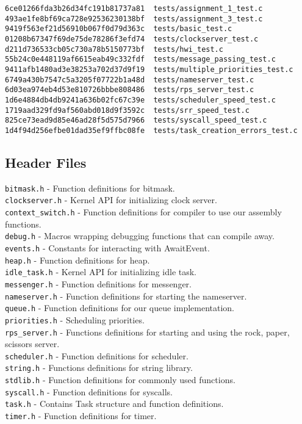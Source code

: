 \documentclass[letterpaper]{article}
\begin{document}
\begin{verbatim}
6ce01266fda3b26d34fc191b81737a81  tests/assignment_1_test.c
493ae1fe8bf69ca728e92536230138bf  tests/assignment_3_test.c
9419f563ef21d56910b067f0d79d363c  tests/basic_test.c
01208b67347f69de75de78286f3efd74  tests/clockserver_test.c
d211d736533cb05c730a78b5150773bf  tests/hwi_test.c
55b24c0e448119af6615eab49c332fdf  tests/message_passing_test.c
9411afb1480ad3e38253a702d37d9f19  tests/multiple_priorities_test.c
6749a430b7547c5a3205f07722b1a48d  tests/nameserver_test.c
6d03ea974eb4d53e810726bbbe808486  tests/rps_server_test.c
1d6e4884db4db9241a636b02fc67c39e  tests/scheduler_speed_test.c
1719aad329fd9af560abd018d9f3592c  tests/srr_speed_test.c
825ce73ead9d85e46ad28f5d575d7966  tests/syscall_speed_test.c
1d4f94d256efbe01dad35ef9ffbc08fe  tests/task_creation_errors_test.c

\end{verbatim}

\subsection{Header Files}
\verb!bitmask.h! - Function definitions for bitmask.\\
\verb!clockserver.h! - Kernel API for initializing clock server.\\
\verb!context_switch.h! - Function definitions for compiler to use our assembly functions.\\
\verb!debug.h! - Macros wrapping debugging functions that can compile away.\\
\verb!events.h! - Constants for interacting with AwaitEvent.\\
\verb!heap.h! - Function definitions for heap.\\
\verb!idle_task.h! - Kernel API for initializing idle task.\\
\verb!messenger.h! - Function definitions for messenger.\\
\verb!nameserver.h! - Function definitions for starting the nameserver.\\
\verb!queue.h! - Function definitions for our queue implementation.\\
\verb!priorities.h! - Scheduling priorities.\\
\verb!rps_server.h! - Functions definitions for starting and using the rock, paper, scissors server. \\
\verb!scheduler.h! - Function definitions for scheduler.\\
\verb!string.h! - Functions definitions for string library.\\
\verb!stdlib.h! - Function definitions for commonly used functions.\\
\verb!syscall.h! - Function definitions for syscalls.\\
\verb!task.h! - Contains Task structure and function definitions.\\
\verb!timer.h! - Function definitions for timer.\\
\end{document}
